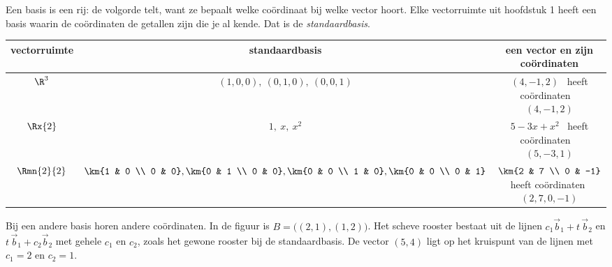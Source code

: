 Een basis is een rij: de volgorde telt, want ze bepaalt welke coördinaat bij welke vector hoort. Elke vectorruimte uit hoofdstuk 1 heeft een basis waarin de coördinaten de getallen zijn die je al kende. Dat is de \textit{standaardbasis}.

\begin{center}
\renewcommand{\arraystretch}{1.45}
\begin{tabular}{|c|c|c|}
\hline
\rowcolor{accent!14} vectorruimte & standaardbasis & een vector en zijn coördinaten \\ \hline
$\R^3$ & $(1, 0, 0),\ (0, 1, 0),\ (0, 0, 1)$ & $(4, -1, 2)$ \ heeft coördinaten \ $(4, -1, 2)$ \\ \hline
$\Rx{2}$ & $1,\ x,\ x^2$ & $5 - 3x + x^2$ \ heeft coördinaten \ $(5, -3, 1)$ \\ \hline
$\Rmn{2}{2}$ & $\km{1 & 0 \\ 0 & 0}, \km{0 & 1 \\ 0 & 0}, \km{0 & 0 \\ 1 & 0}, \km{0 & 0 \\ 0 & 1}$ & $\km{2 & 7 \\ 0 & -1}$ \ heeft coördinaten \ $(2, 7, 0, -1)$ \\ \hline
\end{tabular}
\end{center}

Bij een andere basis horen andere coördinaten. In de figuur is $B = \bigl((2, 1), (1, 2)\bigr)$. Het scheve rooster bestaat uit de lijnen $c_1 \vec b_1 + t\,\vec b_2$ en $t\,\vec b_1 + c_2\vec b_2$ met gehele $c_1$ en $c_2$, zoals het gewone rooster bij de standaardbasis. De vector $(5, 4)$ ligt op het kruispunt van de lijnen met $c_1 = 2$ en $c_2 = 1$.

